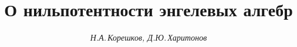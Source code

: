 

 




\newcommand{\la}{\langle} 


\newcommand{\ra}{\rangle} 


\newcommand{\End}{\operatorname{End}} 


\newcommand{\codim}{\operatorname{codim}} 


\newcommand{\Ann}{\operatorname{Ann}} 


\newcommand{\tts}[1]{} 


 




 


\setcounter{page}{17} 












 


\author{\it Н.А.\,Корешков, Д.Ю.\,Харитонов} 




\title{О нильпотентности энгелевых алгебр} 


 


\date{} 




\pagestyle{plain} %


 




\maketitle 


